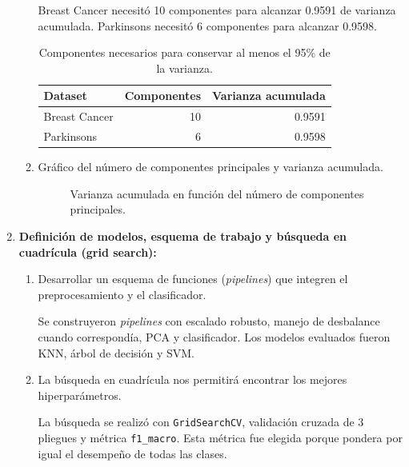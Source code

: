 \documentclass{article}
\begin{document}
\begin{enumerate}
\begin{enumerate}
        Breast Cancer necesitó 10 componentes para alcanzar 0.9591 de varianza acumulada. Parkinsons necesitó 6 componentes para alcanzar 0.9598.

        \begin{table}[h!]
        \centering
        \begin{tabular}{|l|r|r|}
        \hline
        \textbf{Dataset} & \textbf{Componentes} & \textbf{Varianza acumulada} \\
        \hline
        Breast Cancer & 10 & 0.9591 \\
        Parkinsons & 6 & 0.9598 \\
        \hline
        \end{tabular}
        \caption{Componentes necesarios para conservar al menos el 95\% de la varianza.}
        \end{table}

        \item Gráfico del número de componentes principales y varianza acumulada.

        \begin{figure}[h!]
        \centering
        \caption{Varianza acumulada en función del número de componentes principales.}
        \label{fig:pca-variance}
        \end{figure}
    \end{enumerate}

\item \textbf{Definición de modelos, esquema de trabajo y búsqueda en cuadrícula (grid search):}
    \begin{enumerate}
        \item Desarrollar un esquema de funciones (\textit{pipelines}) que integren el preprocesamiento y el clasificador.

        Se construyeron \textit{pipelines} con escalado robusto, manejo de desbalance cuando correspondía, PCA y clasificador. Los modelos evaluados fueron KNN, árbol de decisión y SVM.

        \item La búsqueda en cuadrícula nos permitirá encontrar los mejores hiperparámetros.

        La búsqueda se realizó con \texttt{GridSearchCV}, validación cruzada de 3 pliegues y métrica \texttt{f1\_macro}. Esta métrica fue elegida porque pondera por igual el desempeño de todas las clases.
    \end{enumerate}


\end{enumerate}
\end{document}
